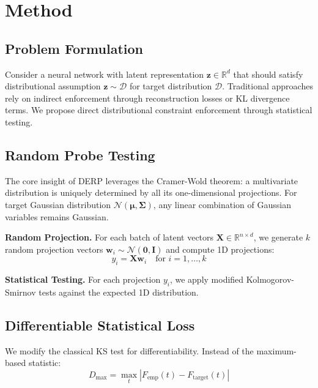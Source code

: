 \documentclass{article}
\begin{document}
\section{Method}

\subsection{Problem Formulation}

Consider a neural network with latent representation $\mathbf{z} \in \mathbb{R}^d$ that should satisfy distributional assumption $\mathbf{z} \sim \mathcal{D}$ for target distribution $\mathcal{D}$. Traditional approaches rely on indirect enforcement through reconstruction losses or KL divergence terms. We propose direct distributional constraint enforcement through statistical testing.

\subsection{Random Probe Testing}

The core insight of DERP leverages the Cramer-Wold theorem: a multivariate distribution is uniquely determined by all its one-dimensional projections. For target Gaussian distribution $\mathcal{N}(\boldsymbol{\mu}, \boldsymbol{\Sigma})$, any linear combination of Gaussian variables remains Gaussian.

\textbf{Random Projection.} For each batch of latent vectors $\mathbf{X} \in \mathbb{R}^{n \times d}$, we generate $k$ random projection vectors $\mathbf{w}_i \sim \mathcal{N}(\mathbf{0}, \mathbf{I})$ and compute 1D projections:
\begin{equation}
y_i = \mathbf{X} \mathbf{w}_i \quad \text{for } i = 1, \ldots, k
\end{equation}

\textbf{Statistical Testing.} For each projection $y_i$, we apply modified Kolmogorov-Smirnov tests against the expected 1D distribution.

\subsection{Differentiable Statistical Loss}

We modify the classical KS test for differentiability. Instead of the maximum-based statistic:
\begin{equation}
D_{\text{max}} = \max_t |F_{\text{emp}}(t) - F_{\text{target}}(t)|
\end{equation}
\end{document}
